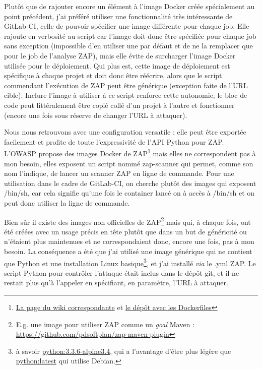 Plutôt que de rajouter encore un élément à l'image Docker créée spécialement au point précédent, j'ai préféré utiliser une fonctionnalité très intéressante de GitLab-CI, celle de pouvoir spécifier une image différente pour chaque job. Elle rajoute en verbosité au script car l'image doit donc être spécifiée pour chaque job sans exception (impossible d'en utiliser une par défaut et de ne la remplacer que pour le job de l'analyse ZAP), mais elle évite de surcharger l'image Docker utilisée pour le déploiement. Qui plus est, cette image de déploiement est spécifique à chaque projet et doit donc être réécrire, alors que le script commendant l'exécution de ZAP peut être générique (exception faite de l'URL cible). Inclure l'image à utiliser à ce script renforce cette autonomie, le bloc de code peut littéralement être copié collé d'un projet à l'autre et fonctionner (encore une fois sous réserve de changer l'URL à attaquer).

Nous nous retrouvons avec une configuration versatile : elle peut être exportée facilement et profite de toute l'expressivité de l'API Python pour ZAP. L'OWASP propose des images Docker de ZAP\footnote{\href{https://github.com/zaproxy/zaproxy/wiki/Docker}{La page du wiki correspondante} et \href{https://github.com/zaproxy/zaproxy/tree/develop/build/docker}{le dépôt avec les Dockerfiles}} mais elles ne correspondent pas à mon besoin, elles exposent un script nommé zap-scanner qui permet, comme son nom l'indique, de lancer un scanner ZAP en ligne de commande. Pour une utilisation dans le cadre de GitLab-CI, on cherche plutôt des images qui exposent /bin/sh, car cela signifie qu'une fois le container lancé on à accès à /bin/sh et on peut donc utiliser la ligne de commande.

Bien sûr il existe des images non officielles de ZAP\footnote{E.g. une image pour utiliser ZAP comme un \textit{goal} Maven : \url{https://github.com/pdsoftplan/zap-maven-plugin}} mais qui, à chaque fois, ont été créées avec un usage précis en tête plutôt que dans un but de généricité ou n'étaient plus maintenues et ne correspondaient donc, encore une fois, pas à mon besoin. La conséquence a été que j'ai utilisé une image générique qui ne contient que Python et une installation Linux basique\footnote{à savoir \href{https://github.com/docker-library/python/blob/d3c5f47b788adb96e69477dadfb0baca1d97f764/3.3/alpine3.4/Dockerfile}{python:3.3.6-alpine3.4}, qui a l'avantage d'être plus légère que \href{https://github.com/docker-library/python/blob/d3c5f47b788adb96e69477dadfb0baca1d97f764/3.6/jessie/Dockerfile}{python:latest} qui utilise Debian.}, et j'ai installé \textit{via} le .yml ZAP. Le script Python pour contrôler l'attaque était inclus dans le dépôt git, et il ne restait plus qu'à l'appeler en spécifiant, en paramètre, l'URL à attaquer. 

